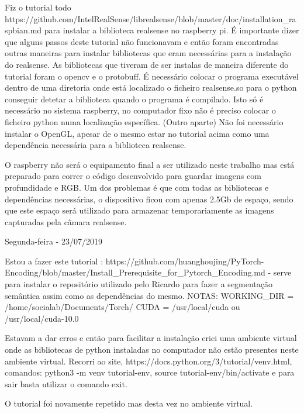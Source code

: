     Fiz o tutorial todo https://github.com/IntelRealSense/librealsense/blob/master/doc/installation\_raspbian.md para instalar a biblioteca realsense no raspberry pi. É importante dizer que alguns passos deste tutorial não funcionavam e então foram encontradas outras maneiras para instalar bibliotecas que eram necessárias para a instalação do realsense. As bibliotecas que tiveram de ser instalas de maneira diferente do tutorial foram o opencv e o protobuff. É necessário colocar o programa executável dentro de uma diretoria onde está localizado o ficheiro realsense.so para o python conseguir detetar a biblioteca quando o programa é compilado. Isto só é necessário no sistema raspberry, no computador fixo não é preciso colocar o ficheiro python numa localização específica. 
    (Outro aparte) Não foi necessário instalar o OpenGL, apesar de o mesmo estar no tutorial acima como uma dependência necessária para a biblioteca realsense. 
    
    O raspberry não será o equipamento final a ser utilizado neste trabalho mas está preparado para correr o código desenvolvido para guardar imagens com profundidade e RGB. Um dos problemas é que com todas as bibliotecas e dependências necessárias, o dispositivo ficou com apenas 2.5Gb de espaço, sendo que este espaço será utilizado para armazenar temporariamente as imagens capturadas pela câmara realsense.
    
    \bigskip
    
    Segunda-feira - 23/07/2019
    
    Estou a fazer este tutorial : https://github.com/huanghoujing/PyTorch-Encoding/blob/master/Install\_Prerequisite\_for\_Pytorch\_Encoding.md - serve para instalar o repositório utilizado pelo Ricardo para fazer a segmentação semântica assim como as dependências do mesmo.
    NOTAS: 
        WORKING\_DIR = /home/socialab/Documents/Torch/
        CUDA = /usr/local/cuda ou /usr/local/cuda-10.0
        
    Estavam a dar erros e então para facilitar a instalação criei uma ambiente virtual onde as bibliotecas de python instaladas no computador não estão presentes neste ambiente virtual. Recorri ao site, https://docs.python.org/3/tutorial/venv.html, comandos: python3 -m venv tutorial-env, source tutorial-env/bin/activate e para sair basta utilizar o comando exit.
    
    O tutorial foi novamente repetido mas desta vez no ambiente virtual.
    
    
    
